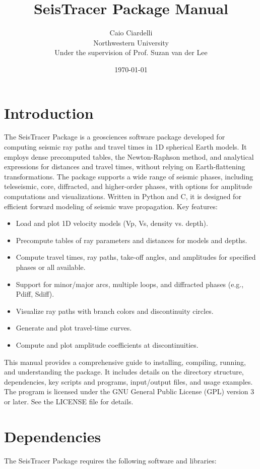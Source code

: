\documentclass[12pt,a4paper]{article}
\title{SeisTracer Package Manual}
\author{Caio Ciardelli \\ Northwestern University \\ Under the supervision of Prof. Suzan van der Lee}
\date{\today}
\begin{document}
\maketitle
\tableofcontents
\newpage

\section{Introduction}
The SeisTracer Package is a geosciences software package developed for computing seismic ray paths and travel times in 1D spherical Earth models. It employs dense precomputed tables, the Newton-Raphson method, and analytical expressions for distances and travel times, without relying on Earth-flattening transformations. The package supports a wide range of seismic phases, including teleseismic, core, diffracted, and higher-order phases, with options for amplitude computations and visualizations. Written in Python and C, it is designed for efficient forward modeling of seismic wave propagation.
Key features:

\begin{itemize}
    \item Load and plot 1D velocity models (Vp, Vs, density vs. depth).
    \item Precompute tables of ray parameters and distances for models and depths.
    \item Compute travel times, ray paths, take-off angles, and amplitudes for specified phases or all available.
    \item Support for minor/major arcs, multiple loops, and diffracted phases (e.g., Pdiff, Sdiff).
    \item Visualize ray paths with branch colors and discontinuity circles.
    \item Generate and plot travel-time curves.
    \item Compute and plot amplitude coefficients at discontinuities.
\end{itemize}

This manual provides a comprehensive guide to installing, compiling, running, and understanding the package. It includes details on the directory structure, dependencies, key scripts and programs, input/output files, and usage examples.
The program is licensed under the GNU General Public License (GPL) version 3 or later. See the LICENSE file for details.

\section{Dependencies}
The SeisTracer Package requires the following software and libraries:
\end{document}

